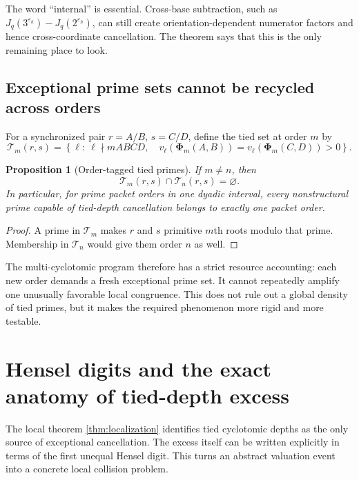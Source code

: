 \documentclass[11pt]{article}
\newtheorem{proposition}[theorem]{Proposition}
\theoremstyle{definition}
\theoremstyle{remark}
\newcommand{\eps}{\varepsilon}
\newcommand{\PhiHom}{\boldsymbol{\Phi}}
\begin{document}
The word ``internal'' is essential.  Cross-base subtraction, such as $J_q(3^{\eps_h})-J_q(2^{\eps_h})$, can still create orientation-dependent numerator factors and hence cross-coordinate cancellation.  The theorem says that this is the only remaining place to look.

\subsection{Exceptional prime sets cannot be recycled across orders}

For a synchronized pair $r=A/B$, $s=C/D$, define the tied set at order $m$ by
\begin{equation}\label{eq:tied-set-m}
 \mathcal T_m(r,s)=
 \left\{\ell:\ \ell\nmid mABCD,\quad
 v_\ell(\PhiHom_m(A,B))=v_\ell(\PhiHom_m(C,D))>0\right\}.
\end{equation}

\begin{proposition}[Order-tagged tied primes]\label{prop:tied-disjoint}
If $m\ne n$, then
\begin{equation}\label{eq:tied-disjoint}
 \mathcal T_m(r,s)\cap\mathcal T_n(r,s)=\varnothing.
\end{equation}
In particular, for prime packet orders in one dyadic interval, every nonstructural prime capable of tied-depth cancellation belongs to exactly one packet order.
\end{proposition}

\begin{proof}
A prime in $\mathcal T_m$ makes $r$ and $s$ primitive $m$th roots modulo that prime.  Membership in $\mathcal T_n$ would give them order $n$ as well.
\end{proof}

The multi-cyclotomic program therefore has a strict resource accounting: each new order demands a fresh exceptional prime set.  It cannot repeatedly amplify one unusually favorable local congruence.  This does not rule out a global density of tied primes, but it makes the required phenomenon more rigid and more testable.

\section{Hensel digits and the exact anatomy of tied-depth excess}
\label{sec:hensel-excess}

The local theorem \cref{thm:localization} identifies tied cyclotomic depths as the only source of exceptional cancellation.  The excess itself can be written explicitly in terms of the first unequal Hensel digit.  This turns an abstract valuation event into a concrete local collision problem.
\end{document}
